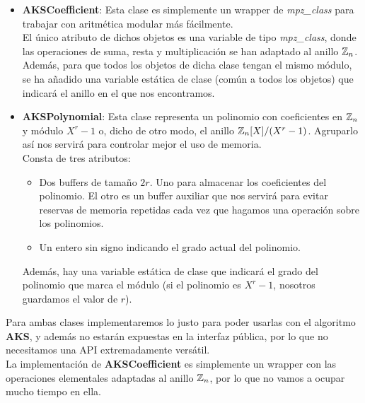\begin{itemize}
	\item \textbf{AKSCoefficient}: Esta clase es simplemente un wrapper de \textit{mpz\_class} para trabajar con aritmética modular más fácilmente.\\
	
	El único atributo de dichos objetos es una variable de tipo \textit{mpz\_class}, donde las operaciones de suma, resta y multiplicación se han adaptado al anillo $\mathbb{Z}_n$.\\
	
	Además, para que todos los objetos de dicha clase tengan el mismo módulo, se ha añadido una variable estática de clase (común a todos los objetos) que indicará el anillo en el que nos encontramos.
	
	\item \textbf{AKSPolynomial}: Esta clase representa un polinomio con coeficientes en $\mathbb{Z}_n$ y módulo $X^r - 1$ o, dicho de otro modo, el anillo $\mathbb{Z}_n[X]/(X^r - 1)$. Agruparlo así nos servirá para controlar mejor el uso de memoria.\\
	
	Consta de tres atributos:
	
	\begin{itemize}
		\item Dos buffers de tamaño $2r$. Uno para almacenar los coeficientes del polinomio. El otro es un buffer auxiliar que nos servirá para evitar reservas de memoria repetidas cada vez que hagamos una operación sobre los polinomios.
		
		\item Un entero sin signo indicando el grado actual del polinomio.
	\end{itemize}
	
	Además, hay una variable estática de clase que indicará el grado del polinomio que marca el módulo (si el polinomio es $X^r - 1$, nosotros guardamos el valor de $r$).
\end{itemize}

Para ambas clases implementaremos lo justo para poder usarlas con el algoritmo \textbf{AKS}, y además no estarán expuestas en la interfaz pública, por lo que no necesitamos una API extremadamente versátil.\\

La implementación de \textbf{AKSCoefficient} es simplemente un wrapper con las operaciones elementales adaptadas al anillo $\mathbb{Z}_n$, por lo que no vamos a ocupar mucho tiempo en ella.\\

